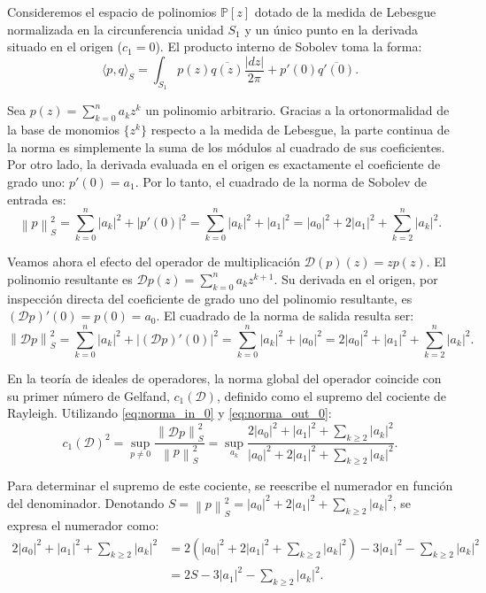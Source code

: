 \documentclass[12pt,a4paper]{article}
\theoremstyle{definition}
\theoremstyle{remark}
\newcommand{\Poly}{\mathbb{P}[z]}
\newcommand{\norm}[1]{\left\| #1 \right\|_S}
\newcommand{\abs}[1]{\left| #1 \right|}
\newcommand{\ip}[2]{\langle #1, #2 \rangle_S}
\newcommand{\D}{\mathcal{D}}
\begin{document}
Consideremos el espacio de polinomios $\Poly$ dotado de la medida de Lebesgue normalizada en la circunferencia unidad $S_1$ y un único punto en la derivada situado en el origen ($c_1 = 0$). El producto interno de Sobolev toma la forma:
\begin{equation}
    \ip{p}{q} = \int_{S_1} p(z)\overline{q(z)} \frac{\abs{dz}}{2\pi} + p'(0)\overline{q'(0)}.
\end{equation}

Sea $p(z) = \sum_{k=0}^n a_k z^k$ un polinomio arbitrario. Gracias a la ortonormalidad de la base de monomios $\{z^k\}$ respecto a la medida de Lebesgue, la parte continua de la norma es simplemente la suma de los módulos al cuadrado de sus coeficientes. Por otro lado, la derivada evaluada en el origen es exactamente el coeficiente de grado uno: $p'(0) = a_1$.
Por lo tanto, el cuadrado de la norma de Sobolev de entrada es:
\begin{equation} \label{eq:norma_in_0}
    \norm{p}^2 = \sum_{k=0}^n \abs{a_k}^2 + \abs{p'(0)}^2 = \sum_{k=0}^n \abs{a_k}^2 + \abs{a_1}^2 = \abs{a_0}^2 + 2\abs{a_1}^2 + \sum_{k=2}^n \abs{a_k}^2.
\end{equation}

Veamos ahora el efecto del operador de multiplicación $\D(p)(z) = z p(z)$. El polinomio resultante es $\D p(z) = \sum_{k=0}^n a_k z^{k+1}$. Su derivada en el origen, por inspección directa del coeficiente de grado uno del polinomio resultante, es $(\D p)'(0) = p(0) = a_0$.
El cuadrado de la norma de salida resulta ser:
\begin{equation} \label{eq:norma_out_0}
    \norm{\D p}^2 = \sum_{k=0}^n \abs{a_k}^2 + \abs{(\D p)'(0)}^2 = \sum_{k=0}^n \abs{a_k}^2 + \abs{a_0}^2 = 2\abs{a_0}^2 + \abs{a_1}^2 + \sum_{k=2}^n \abs{a_k}^2.
\end{equation}

En la teoría de ideales de operadores, la norma global del operador coincide con su primer número de Gelfand, $c_1(\D)$, definido como el supremo del cociente de Rayleigh. Utilizando \eqref{eq:norma_in_0} y \eqref{eq:norma_out_0}:
\begin{equation}
    c_1(\D)^2 = \sup_{p \neq 0} \frac{\norm{\D p}^2}{\norm{p}^2} = \sup_{a_k} \frac{2\abs{a_0}^2 + \abs{a_1}^2 + \sum_{k \ge 2} \abs{a_k}^2}{\abs{a_0}^2 + 2\abs{a_1}^2 + \sum_{k \ge 2} \abs{a_k}^2}.
\end{equation}

Para determinar el supremo de este cociente, se reescribe el numerador en función del denominador. Denotando $S = \norm{p}^2 = \abs{a_0}^2 + 2\abs{a_1}^2 + \sum_{k \ge 2} \abs{a_k}^2$, se expresa el numerador como:
\begin{align*}
    2\abs{a_0}^2 + \abs{a_1}^2 + \sum_{k \ge 2} \abs{a_k}^2 & = 2\left( \abs{a_0}^2 + 2\abs{a_1}^2 + \sum_{k \ge 2} \abs{a_k}^2 \right) - 3\abs{a_1}^2 - \sum_{k \ge 2} \abs{a_k}^2 \\
                                                            & = 2S - 3\abs{a_1}^2 - \sum_{k \ge 2} \abs{a_k}^2.
\end{align*}
\end{document}
